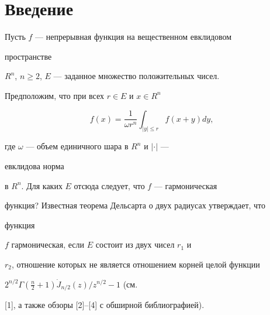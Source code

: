   


\date{}  




\pagestyle{plain} %


  




\maketitle  


\label{begin}  


 


\section*{Введение} 


 


Пусть $f$ --- непрерывная функция на вещественном евклидовом 


пространстве 


$R^n$, $n\ge2$, $E$ --- заданное множество положительных чисел. 


Предположим, что при всех $r\in E$ и $x\in R^n$ 


\begin{equation} 


f(x)=\frac{1}{\omega r^n}\int_{|y|\le r}f(x+y)d y, 


\end{equation} 


где $\omega$ --- объем единичного шара в $R^n$ и $|\cdot|$ --- 


евклидова норма 


в $R^n$. Для каких $E$ отсюда следует, что $f$ --- гармоническая 


функция? Известная теорема Дельсарта о двух радиусах утверждает, что 


функция 


$f$ гармоническая, если $E$ состоит из двух чисел $r_1$ и 


$r_2$, отношение которых не является отношением корней целой функции 


$2^{n/2}\Gamma\left(\frac{n}{2}+1\right)\Dot J_{n/2}(z)/z^{n/2}-1$ (см. 


[1], а также обзоры [2]--[4] с обширной библиографией). 


